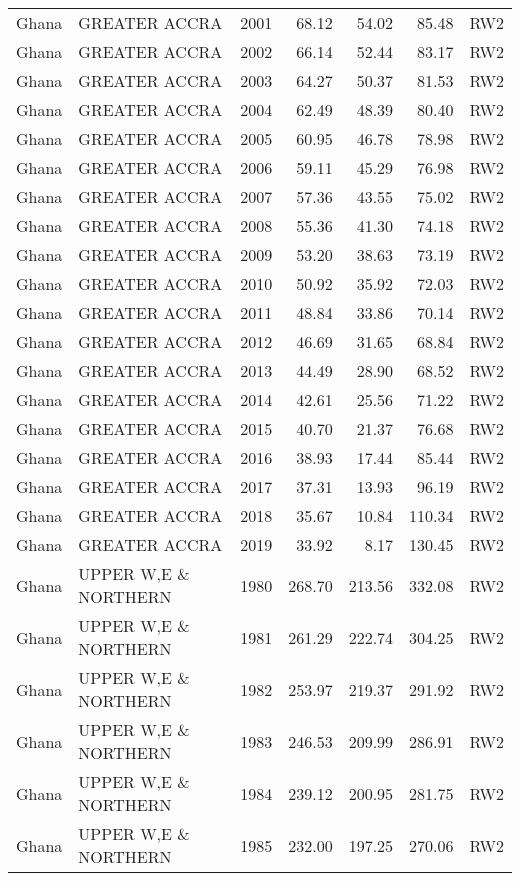 \begin{longtable}{lllrrrl}
  Ghana & GREATER ACCRA & 2001 & 68.12 & 54.02 & 85.48 & RW2 \\ 
  Ghana & GREATER ACCRA & 2002 & 66.14 & 52.44 & 83.17 & RW2 \\ 
  Ghana & GREATER ACCRA & 2003 & 64.27 & 50.37 & 81.53 & RW2 \\ 
  Ghana & GREATER ACCRA & 2004 & 62.49 & 48.39 & 80.40 & RW2 \\ 
  Ghana & GREATER ACCRA & 2005 & 60.95 & 46.78 & 78.98 & RW2 \\ 
  Ghana & GREATER ACCRA & 2006 & 59.11 & 45.29 & 76.98 & RW2 \\ 
  Ghana & GREATER ACCRA & 2007 & 57.36 & 43.55 & 75.02 & RW2 \\ 
  Ghana & GREATER ACCRA & 2008 & 55.36 & 41.30 & 74.18 & RW2 \\ 
  Ghana & GREATER ACCRA & 2009 & 53.20 & 38.63 & 73.19 & RW2 \\ 
  Ghana & GREATER ACCRA & 2010 & 50.92 & 35.92 & 72.03 & RW2 \\ 
  Ghana & GREATER ACCRA & 2011 & 48.84 & 33.86 & 70.14 & RW2 \\ 
  Ghana & GREATER ACCRA & 2012 & 46.69 & 31.65 & 68.84 & RW2 \\ 
  Ghana & GREATER ACCRA & 2013 & 44.49 & 28.90 & 68.52 & RW2 \\ 
  Ghana & GREATER ACCRA & 2014 & 42.61 & 25.56 & 71.22 & RW2 \\ 
  Ghana & GREATER ACCRA & 2015 & 40.70 & 21.37 & 76.68 & RW2 \\ 
  Ghana & GREATER ACCRA & 2016 & 38.93 & 17.44 & 85.44 & RW2 \\ 
  Ghana & GREATER ACCRA & 2017 & 37.31 & 13.93 & 96.19 & RW2 \\ 
  Ghana & GREATER ACCRA & 2018 & 35.67 & 10.84 & 110.34 & RW2 \\ 
  Ghana & GREATER ACCRA & 2019 & 33.92 & 8.17 & 130.45 & RW2 \\ 
  Ghana & UPPER W,E \& NORTHERN & 1980 & 268.70 & 213.56 & 332.08 & RW2 \\ 
  Ghana & UPPER W,E \& NORTHERN & 1981 & 261.29 & 222.74 & 304.25 & RW2 \\ 
  Ghana & UPPER W,E \& NORTHERN & 1982 & 253.97 & 219.37 & 291.92 & RW2 \\ 
  Ghana & UPPER W,E \& NORTHERN & 1983 & 246.53 & 209.99 & 286.91 & RW2 \\ 
  Ghana & UPPER W,E \& NORTHERN & 1984 & 239.12 & 200.95 & 281.75 & RW2 \\ 
  Ghana & UPPER W,E \& NORTHERN & 1985 & 232.00 & 197.25 & 270.06 & RW2 \\ 

\end{longtable}
